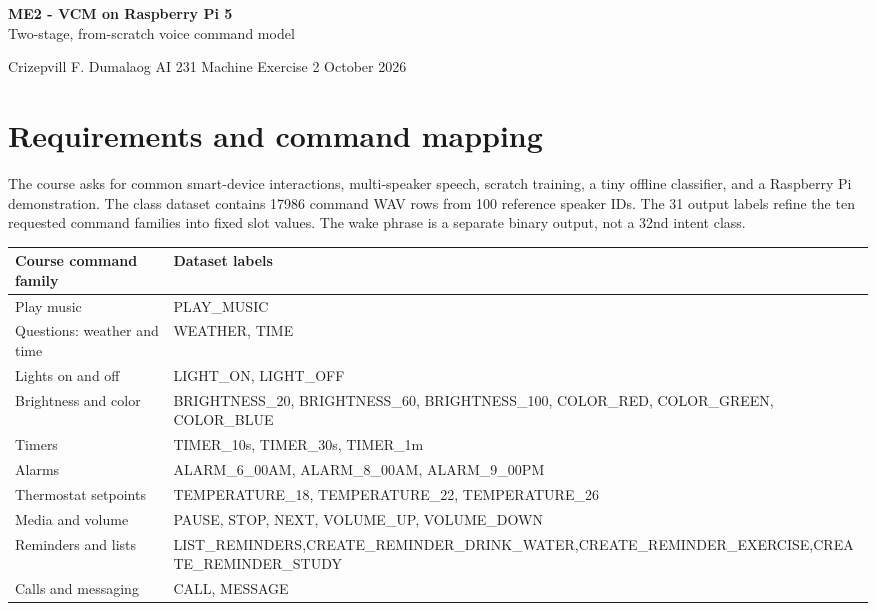 \documentclass[11pt,a4paper]{article}
\begin{document}
\begin{center}
{\LARGE\bfseries ME2 - VCM on Raspberry Pi 5\\[5pt]}
{\large Two-stage, from-scratch voice command model}\par
Crizepvill F. Dumalaog \quad AI 231 Machine Exercise 2  October 2026
\end{center}

\begin{abstract}
This report documents the current training artifacts and code, including measured limits. A binary 2-class wake detector continuously evaluates local audio, then a 31-class intent classifier maps an accepted command to a coded action. Both use the same TinyDSCNN-48 topology and a 40-band log-mel frontend. Weather uses a separate live API; recognition itself uses no cloud model. The staged INT8 pair totals \textbf{76740 bytes}. The 95\% per-class goal is assessed on a reused speaker-held-out command set and is not assumed to be met.
\end{abstract}

\section{Requirements and command mapping}
The course asks for common smart-device interactions, multi-speaker speech, scratch training, a tiny offline classifier, and a Raspberry Pi demonstration. The class dataset contains 17986 command WAV rows from 100 reference speaker IDs. The 31 output labels refine the ten requested command families into fixed slot values. The wake phrase is a separate binary output, not a 32nd intent class.

\small
\begin{longtable}{p{}>{\raggedright\arraybackslash}p{}}
\toprule Course command family & Dataset labels \\
\midrule\endhead
Play music & PLAY\_MUSIC \\
Questions: weather and time & WEATHER, TIME \\
Lights on and off & LIGHT\_ON, LIGHT\_OFF \\
Brightness and color & BRIGHTNESS\_20, BRIGHTNESS\_60, BRIGHTNESS\_100, COLOR\_RED, COLOR\_GREEN, COLOR\_BLUE \\
Timers & TIMER\_10s, TIMER\_30s, TIMER\_1m \\
Alarms & ALARM\_6\_00AM, ALARM\_8\_00AM, ALARM\_9\_00PM \\
Thermostat setpoints & TEMPERATURE\_18, TEMPERATURE\_22, TEMPERATURE\_26 \\
Media and volume & PAUSE, STOP, NEXT, VOLUME\_UP, VOLUME\_DOWN \\
Reminders and lists & LIST\_REMINDERS,\newline CREATE\_REMINDER\_DRINK\_WATER,\newline CREATE\_REMINDER\_EXERCISE,\newline CREATE\_REMINDER\_STUDY \\
Calls and messaging & CALL, MESSAGE \\
\bottomrule
\end{longtable}
\normalsize
\end{document}
